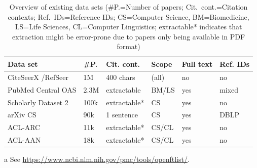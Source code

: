 \begin{table}[tb]
 \caption[Overview of existing data sets]{Overview of existing data sets (\#P.=Number of papers; Cit.\ cont.=Citation contexts; Ref.\ IDs=Reference IDs; CS=Computer Science, BM=Biomedicine, LS=Life Sciences, CL=Computer Linguistics; extractable* indicates that extraction might be error-prone due to papers only being available in PDF format)}
 \label{tab:existing-data-sets}
  \centering
  \begin{small}
 \begin{threeparttable}
 \begin{tabular}{llllll}
 \toprule
   Data set & \#P. & Cit. cont. & Scope & Full text & Ref. IDs \\
   \midrule
   CiteSeerX \cite{Caragea2014}/RefSeer \cite{Huang2015fixed} &  1M & 400 chars & (all) & no & no \\
   PubMed Central OAS\tnote{a} & 2.3M & extractable & BM/LS & yes & mixed \\
   Scholarly Dataset 2 \cite{Sugiyama2015} & 100k & extractable* & CS & yes & no \\
   arXiv CS \cite{Faerber2018LREC}   &  90k & 1 sentence & CS & yes & DBLP \\
   ACL-ARC \cite{Bird2008ACLARC} & 11k & extractable* & CS/CL & yes & no \\
   ACL-AAN \cite{Radev2013} & 18k & extractable* & CS/CL & yes & no  \\
   \bottomrule
 \end{tabular}
 \begin{tablenotes}
    \item[a] See \url{https://www.ncbi.nlm.nih.gov/pmc/tools/openftlist/}.
  \end{tablenotes}
\end{threeparttable}
  \end{small}
\end{table}

